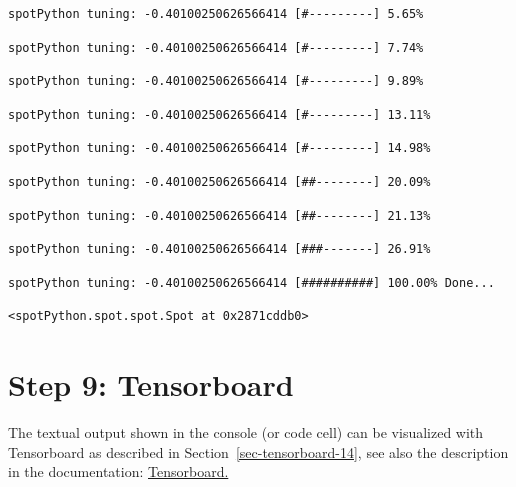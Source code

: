 \documentclass[
  letterpaper,
  DIV=11,
  numbers=noendperiod]{scrreprt}
\begin{document}
\begin{verbatim}
spotPython tuning: -0.40100250626566414 [#---------] 5.65% 
\end{verbatim}

\begin{verbatim}
spotPython tuning: -0.40100250626566414 [#---------] 7.74% 
\end{verbatim}

\begin{verbatim}
spotPython tuning: -0.40100250626566414 [#---------] 9.89% 
\end{verbatim}

\begin{verbatim}
spotPython tuning: -0.40100250626566414 [#---------] 13.11% 
\end{verbatim}

\begin{verbatim}
spotPython tuning: -0.40100250626566414 [#---------] 14.98% 
\end{verbatim}

\begin{verbatim}
spotPython tuning: -0.40100250626566414 [##--------] 20.09% 
\end{verbatim}

\begin{verbatim}
spotPython tuning: -0.40100250626566414 [##--------] 21.13% 
\end{verbatim}

\begin{verbatim}
spotPython tuning: -0.40100250626566414 [###-------] 26.91% 
\end{verbatim}

\begin{verbatim}
spotPython tuning: -0.40100250626566414 [##########] 100.00% Done...
\end{verbatim}

\begin{verbatim}
<spotPython.spot.spot.Spot at 0x2871cddb0>
\end{verbatim}

\hypertarget{sec-tensorboard-17}{%
\section{Step 9: Tensorboard}\label{sec-tensorboard-17}}

The textual output shown in the console (or code cell) can be visualized
with Tensorboard as described in Section~\ref{sec-tensorboard-14}, see
also the description in the documentation:
\href{https://sequential-parameter-optimization.github.io/spotPython/14_spot_ray_hpt_torch_cifar10.html\#sec-tensorboard-14}{Tensorboard.}
\end{document}
